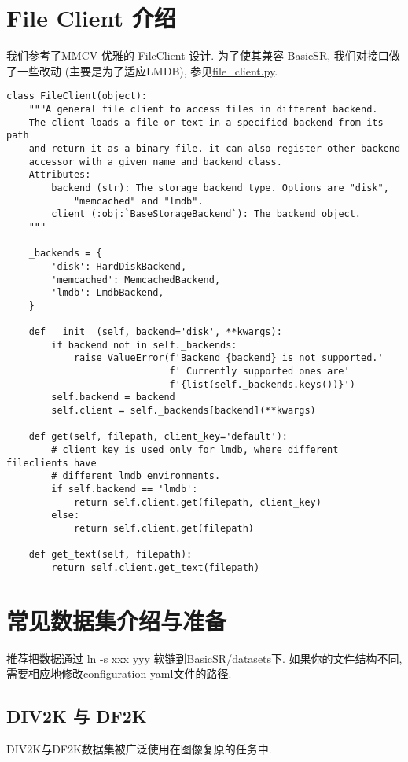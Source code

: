 \documentclass[../main.tex]{subfiles}
\begin{document}
\section{File Client 介绍}
我们参考了MMCV 优雅的 FileClient 设计. 为了使其兼容 BasicSR, 我们对接口做了一些改动 (主要是为了适应LMDB), 参见\href{https://github.com/XPixelGroup/BasicSR/blob/master/basicsr/utils/file_client.py}{file\_client.py}.

\begin{verbatim}
class FileClient(object):
    """A general file client to access files in different backend.
    The client loads a file or text in a specified backend from its path
    and return it as a binary file. it can also register other backend
    accessor with a given name and backend class.
    Attributes:
        backend (str): The storage backend type. Options are "disk",
            "memcached" and "lmdb".
        client (:obj:`BaseStorageBackend`): The backend object.
    """

    _backends = {
        'disk': HardDiskBackend,
        'memcached': MemcachedBackend,
        'lmdb': LmdbBackend,
    }

    def __init__(self, backend='disk', **kwargs):
        if backend not in self._backends:
            raise ValueError(f'Backend {backend} is not supported.'
                             f' Currently supported ones are' 
                             f'{list(self._backends.keys())}')
        self.backend = backend
        self.client = self._backends[backend](**kwargs)

    def get(self, filepath, client_key='default'):
        # client_key is used only for lmdb, where different fileclients have
        # different lmdb environments.
        if self.backend == 'lmdb':
            return self.client.get(filepath, client_key)
        else:
            return self.client.get(filepath)

    def get_text(self, filepath):
        return self.client.get_text(filepath)
\end{verbatim}



\section{常见数据集介绍与准备}
推荐把数据通过 ln -s xxx yyy 软链到BasicSR/datasets下. 如果你的文件结构不同, 需要相应地修改configuration yaml文件的路径.
\subsection{DIV2K 与 DF2K}
DIV2K与DF2K数据集被广泛使用在图像复原的任务中.
\end{document}
